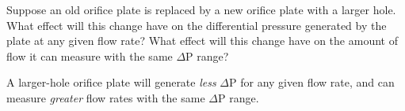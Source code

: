 

Suppose an old orifice plate is replaced by a new orifice plate with a larger hole.  What effect will this change have on the differential pressure generated by the plate at any given flow rate?  What effect will this change have on the amount of flow it can measure with the same $\Delta$P range?







A larger-hole orifice plate will generate {\it less} $\Delta$P for any given flow rate, and can measure {\it greater} flow rates with the same $\Delta$P range.










